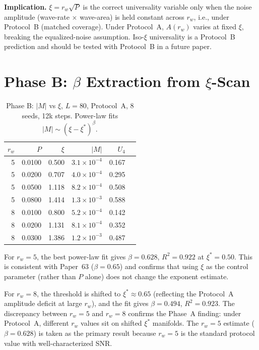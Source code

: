 \documentclass[twocolumn,10pt]{article}
\begin{document}
\textbf{Implication.}
$\xi=r_w\sqrt{P}$ is the correct universality variable only when the
noise amplitude (wave-rate $\times$ wave-area) is held constant across $r_w$,
i.e., under Protocol~B (matched coverage).
Under Protocol~A, $A(r_w)$ varies at fixed $\xi$, breaking the equalized-noise
assumption.
Iso-$\xi$ universality is a Protocol~B prediction and should be tested with
Protocol~B in a future paper.

\section{Phase B: $\beta$ Extraction from $\xi$-Scan}

\begin{table}[h]
\centering
\caption{Phase B: $|M|$ vs $\xi$, $L=80$, Protocol~A, 8 seeds, 12k steps.
Power-law fits $|M|\sim(\xi-\xi^*)^\beta$.}
\label{tab:beta}
\begin{tabular}{rrrrrr}
\toprule
$r_w$ & $P$ & $\xi$ & $|M|$ & $U_4$ \\
\midrule
5 & 0.0100 & 0.500 & $3.1\times10^{-4}$ & 0.167 \\
5 & 0.0200 & 0.707 & $4.0\times10^{-4}$ & 0.295 \\
5 & 0.0500 & 1.118 & $8.2\times10^{-4}$ & 0.508 \\
5 & 0.0800 & 1.414 & $1.3\times10^{-3}$ & 0.588 \\
\midrule
8 & 0.0100 & 0.800 & $5.2\times10^{-4}$ & 0.142 \\
8 & 0.0200 & 1.131 & $8.1\times10^{-4}$ & 0.352 \\
8 & 0.0300 & 1.386 & $1.2\times10^{-3}$ & 0.487 \\
\bottomrule
\end{tabular}
\end{table}

For $r_w=5$, the best power-law fit gives $\beta=0.628$, $R^2=0.922$
at $\xi^*=0.50$.
This is consistent with Paper~63 ($\beta=0.65$) and confirms that using
$\xi$ as the control parameter (rather than $P$ alone) does not change the
exponent estimate.

For $r_w=8$, the threshold is shifted to $\xi^*\approx0.65$ (reflecting
the Protocol~A amplitude deficit at large $r_w$), and the fit gives
$\beta=0.494$, $R^2=0.923$.
The discrepancy between $r_w=5$ and $r_w=8$ confirms the Phase~A finding:
under Protocol~A, different $r_w$ values sit on shifted $\xi^*$ manifolds.
The $r_w=5$ estimate ($\beta=0.628$) is taken as the primary result
because $r_w=5$ is the standard protocol value with well-characterized SNR.
\end{document}

